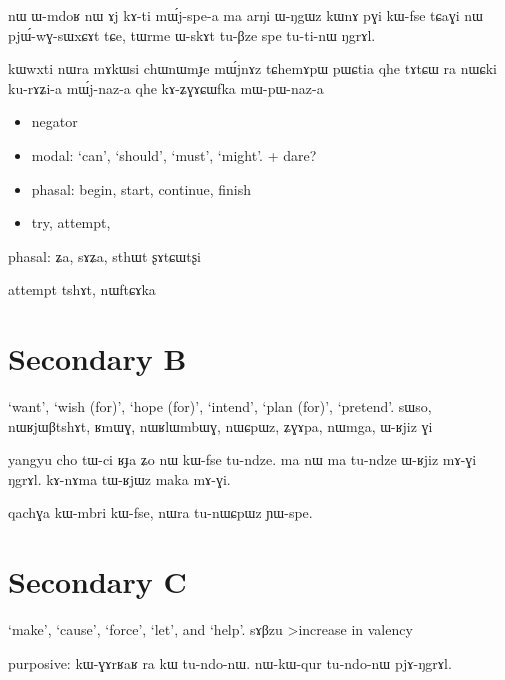 \documentclass[oldfontcommands,oneside,a4paper,11pt]{article}
\begin{document}
nɯ ɯ-mdoʁ nɯ ɤj kɤ-ti mɯ́j-spe-a ma arŋi ɯ-ŋgɯz kɯnɤ pɣi kɯ-fse
tɕaɣi nɯ pjɯ́-wɣ-sɯxɕɤt tɕe, tɯrme ɯ-skɤt tu-βze spe tu-ti-nɯ ŋgrɤl.



kɯwxti nɯra mɤkɯsi chɯnɯmɟe mɯ́jnɤz
tɕhemɤpɯ pɯɕtia qhe tɤtɕɯ ra nɯɕki ku-rɤʑi-a mɯ́j-naz-a qhe
kɤ-ʑɣɤɕɯfka mɯ-pɯ-naz-a

 \begin{itemize}
\item negator
\item modal: ‘can’, ‘should’, ‘must’, ‘might’. + dare?
\item phasal: begin, start, continue, finish
\item try, attempt,  
\end{itemize}

phasal: ʑa, sɤʑa, sthɯt ʂɤtɕɯtʂi

attempt
tshɤt,  nɯftɕɤka
  \section{Secondary B} 
 ‘want’, ‘wish (for)’, ‘hope (for)’, ‘intend’, ‘plan (for)’, ‘pretend’.
sɯso, nɯʁjɯβtshɤt, ʁmɯɣ, nɯʁlɯmbɯɣ, nɯɕpɯz, ʑɣɤpa, nɯmga, ɯ-ʁjiz ɣi

yangyu cho tɯ-ci ʁɟa ʑo nɯ kɯ-fse tu-ndze.
ma nɯ ma tu-ndze ɯ-ʁjiz mɤ-ɣi ŋgrɤl.
kɤ-nɤma tɯ-ʁjɯz maka mɤ-ɣi.


qachɣa kɯ-mbri kɯ-fse, nɯra tu-nɯɕpɯz ɲɯ-spe. 

  \section{Secondary C} 
‘make’, ‘cause’, ‘force’, ‘let’, and ‘help’.
sɤβzu
>increase in valency


purposive:
kɯ-ɣɤrʁaʁ ra kɯ tu-ndo-nɯ.
nɯ-kɯ-qur tu-ndo-nɯ pjɤ-ŋgrɤl.

  \
 
 




\end{document}
